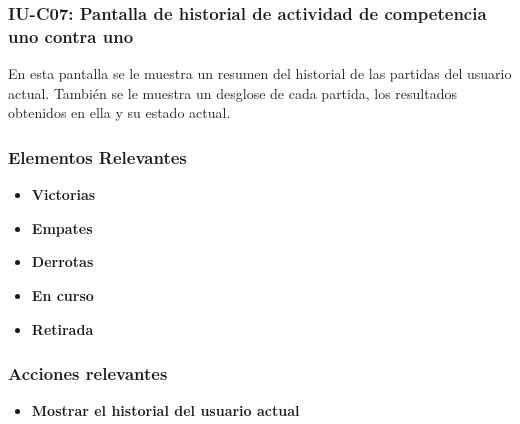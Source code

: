 
\subsubsection{IU-C07: Pantalla de historial de actividad de competencia uno contra uno}

 En esta pantalla se le muestra un resumen del historial de las partidas del usuario actual. También se le muestra un desglose de cada partida, los resultados obtenidos en ella y su estado actual.


\subsubsection{Elementos Relevantes}

    \begin{itemize}
    \item {\bf Victorias}
    \item {\bf Empates}
    \item {\bf Derrotas}
    \item {\bf En curso}
    \item {\bf Retirada}

    \end{itemize}

\subsubsection{Acciones relevantes}

    \begin{itemize}
    \item {\bf Mostrar el historial del usuario actual}

    \end{itemize}

\clearpage
